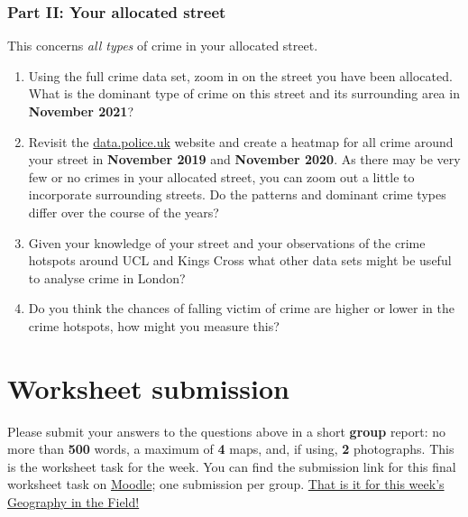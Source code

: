 \documentclass[
]{book}
\providecommand{\tightlist}{%
  \setlength{\itemsep}{0pt}\setlength{\parskip}{0pt}}
\begin{document}
\hypertarget{part-ii-your-allocated-street}{%
\subsubsection*{Part II: Your allocated street}\label{part-ii-your-allocated-street}}

This concerns \emph{all types} of crime in your allocated street.

\begin{enumerate}
\def\labelenumi{\arabic{enumi}.}
\setcounter{enumi}{2}
\tightlist
\item
  Using the full crime data set, zoom in on the street you have been allocated. What is the dominant type of crime on this street and its surrounding area in \textbf{November 2021}?
\item
  Revisit the \href{https://data.police.uk/}{data.police.uk} website and create a heatmap for all crime around your street in \textbf{November 2019} and \textbf{November 2020}. As there may be very few or no crimes in your allocated street, you can zoom out a little to incorporate surrounding streets. Do the patterns and dominant crime types differ over the course of the years?
\item
  Given your knowledge of your street and your observations of the crime hotspots around UCL and Kings Cross what other data sets might be useful to analyse crime in London?
\item
  Do you think the chances of falling victim of crime are higher or lower in the crime hotspots, how might you measure this?
\end{enumerate}

\hypertarget{worksheet-submission}{%
\section*{Worksheet submission}\label{worksheet-submission}}

Please submit your answers to the questions above in a short \textbf{group} report: no more than \textbf{500} words, a maximum of \textbf{4} maps, and, if using, \textbf{2} photographs. This is the worksheet task for the week. You can find the submission link for this final worksheet task on \href{https://moodle.ucl.ac.uk/course/view.php?id=23839}{Moodle}; one submission per group. \href{https://www.youtube.com/watch?v=h_D3VFfhvs4}{That is it for this week's Geography in the Field!}
\end{document}
